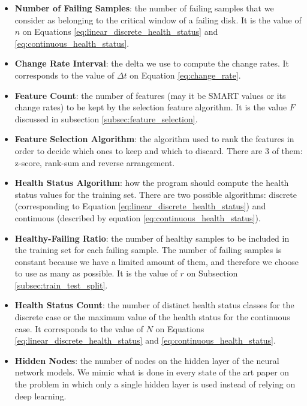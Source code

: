 \begin{itemize}
  \item \textbf{Number of Failing Samples}: the number of failing samples that we consider as belonging to the critical window of a failing disk. 
  It is the value of $n$ on Equations \ref{eq:linear_discrete_health_status} and \ref{eq:continuous_health_status}.

  \item \textbf{Change Rate Interval}: the delta we use to compute the change rates.
  It corresponds to the value of $\Delta t$ on Equation \ref{eq:change_rate}.

  \item \textbf{Feature Count}: the number of features (may it be SMART values or its change rates) to be kept by the selection feature algorithm.
  It is the value $F$ discussed in subsection \ref{subsec:feature_selection}.

  \item \textbf{Feature Selection Algorithm}: the algorithm used to rank the features in order to decide which ones to keep and which to discard.
  There are 3 of them: z-score, rank-sum and reverse arrangement.

  \item \textbf{Health Status Algorithm}: how the program should compute the health status values for the training set.
  There are two possible algorithms: discrete (corresponding to Equation \ref{eq:linear_discrete_health_status}) and continuous (described by equation \ref{eq:continuous_health_status}).
  
  \item \textbf{Healthy-Failing Ratio}: the number of healthy samples to be included in the training set for each failing sample.
  The number of failing samples is constant because we have a limited amount of them, and therefore we choose to use as many as possible.
  It is the value of $r$ on Subsection \ref{subsec:train_test_split}.

  \item \textbf{Health Status Count}: the number of distinct health status classes for the discrete case or the maximum value of the health status for the continuous case.
  It corresponds to the value of $N$ on Equations \ref{eq:linear_discrete_health_status} and \ref{eq:continuous_health_status}.

  \item \textbf{Hidden Nodes}: the number of nodes on the hidden layer of the neural network models.
  We mimic what is done in every state of the art paper on the problem in which only a single hidden layer is used instead of relying on deep learning.


\end{itemize}
